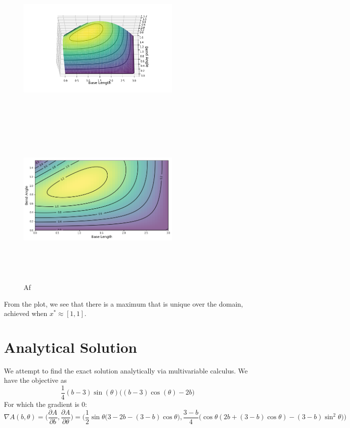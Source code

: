 \documentclass{article}
\begin{document}
\begin{figure}[h]
\includegraphics[width = 8cm, height = 8cm]{p1.png}
\includegraphics[width = 8cm, height = 8cm]{p2.png}
\caption{Af }
\end{figure}





From the plot, we see that there is a maximum that is unique over the domain, achieved when $x^* \approx [1,1]$.
\newpage
\section*{Analytical Solution}
We attempt to find the exact solution analytically via multivariable calculus. We have the objective  as
$$\frac{1}{4}(b-3) \sin(\theta) \big((b-3)\cos(\theta) - 2b \big)$$
For which the gradient is 0:
$$ \nabla A(b,\theta) = \bigg(\frac{\partial A}{\partial b}, \frac{\partial A}{\partial \theta} \bigg) = \bigg(\frac{1}{2} \sin \theta \big(3 - 2b - (3-b)\cos \theta),  \frac{3-b}{4} \big (\cos \theta (2b + (3-b)\cos \theta ) - (3-b) \sin^2 \theta \big)  \bigg)$$
\end{document}
